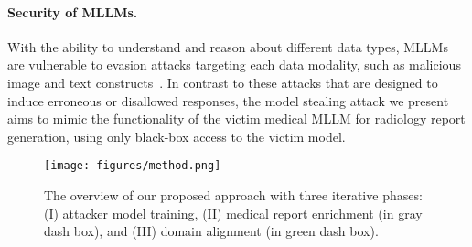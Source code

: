 \paragraph{Security of \aclp{MLLM}.}
With the ability to understand and reason about different data types, \acp{MLLM} are vulnerable to evasion attacks targeting each data modality, such as malicious image and text constructs~\citep{mllm-aa, mllm-safety}.
In contrast to these attacks that are designed to induce erroneous or disallowed responses, the model stealing attack we present aims to mimic the functionality of the victim medical \ac{MLLM} for radiology report generation, using only black-box access to the victim model.

\begin{figure*}[t]
\centering
\texttt{[image: figures/method.png]} 
\caption{The overview of our proposed approach with three iterative phases: (I) attacker model training, (II) medical report enrichment (in gray dash box), and (III) domain alignment (in green dash box).}
\label{fig: method}
\end{figure*}
